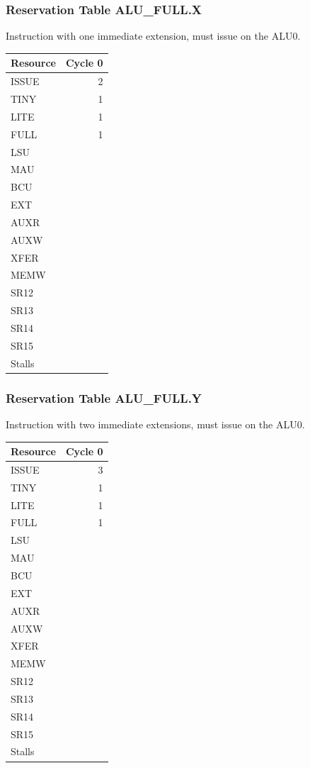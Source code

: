 \subsubsection{Reservation Table ALU\_FULL.X} \label{sec:reservation-ALU-FULL.X}

Instruction with one immediate extension, must issue on the ALU0.
\medskip

\begin{tabular}{|l|r|} \hline
Resource	& Cycle 0 \\ \hline
\textsf{ISSUE}	& 2	\\
\textsf{TINY}	& 1	\\
\textsf{LITE}	& 1	\\
\textsf{FULL}	& 1	\\
\textsf{LSU}	& 	\\
\textsf{MAU}	& 	\\
\textsf{BCU}	& 	\\
\textsf{EXT}	& 	\\
\textsf{AUXR}	& 	\\
\textsf{AUXW}	& 	\\
\textsf{XFER}	& 	\\
\textsf{MEMW}	& 	\\
\textsf{SR12}	& 	\\
\textsf{SR13}	& 	\\
\textsf{SR14}	& 	\\
\textsf{SR15}	& 	\\
\hline Stalls	& 	\\
\hline \end{tabular}

\subsubsection{Reservation Table ALU\_FULL.Y} \label{sec:reservation-ALU-FULL.Y}

Instruction with two immediate extensions, must issue on the ALU0.
\medskip

\begin{tabular}{|l|r|} \hline
Resource	& Cycle 0 \\ \hline
\textsf{ISSUE}	& 3	\\
\textsf{TINY}	& 1	\\
\textsf{LITE}	& 1	\\
\textsf{FULL}	& 1	\\
\textsf{LSU}	& 	\\
\textsf{MAU}	& 	\\
\textsf{BCU}	& 	\\
\textsf{EXT}	& 	\\
\textsf{AUXR}	& 	\\
\textsf{AUXW}	& 	\\
\textsf{XFER}	& 	\\
\textsf{MEMW}	& 	\\
\textsf{SR12}	& 	\\
\textsf{SR13}	& 	\\
\textsf{SR14}	& 	\\
\textsf{SR15}	& 	\\
\hline Stalls	& 	\\
\hline \end{tabular}

